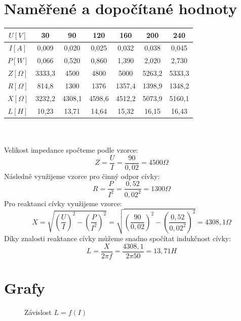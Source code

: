 \documentclass[12pt]{article} %
\begin{document}
\section{Naměřené a dopočítané hodnoty}
\begin{tabular}{|c|c|c|c|c|c|c|}
\hline 
$U[V]$ & 30 & 90 & 120 & 160 & 200 & 240 \\ 
\hline 
$I[A]$ & 0,009 & 0,020 & 0,025 & 0,032 & 0,038 & 0,045 \\ 
\hline 
$P[W]$ & 0,066 & 0,520 & 0,860 & 1,390 & 2,020 & 2,730 \\ 
\hline 
$Z[\Omega]$ & 3333,3 & 4500 & 4800 & 5000 & 5263,2 & 5333,3 \\ 
\hline 
$R[\Omega]$ & 814,8 & 1300 & 1376 & 1357,4 & 1398,9 & 1348,2 \\ 
\hline 
$X[\Omega]$ & 3232,2 & 4308,1 & 4598,6 & 4512,2 & 5073,9 & 5160,1 \\ 
\hline 
$L[H]$ & 10,23 & 13,71 & 14,64 & 15,32 & 16,15 & 16,43 \\ 
\hline 
\end{tabular}
\linebreak \\\\
Velikost impedance spočteme podle vzorce:
\begin{equation}
Z = \frac{U}{I} = \frac{90}{0,02} = 4500 \Omega
\end{equation}
Následně využijeme vzorce pro činný odpor cívky:
\begin{equation}
R = \frac{P}{I^2} = \frac{0,52}{0,02^2} = 1300 \Omega
\end{equation}
Pro reaktanci cívky využijeme vzorce:
\begin{equation}
X = \sqrt{\left(\frac{U}{I}\right)^2-\left(\frac{P}{I^2}\right)^2} = \sqrt{\left(\frac{90}{0,02}\right)^2-\left(\frac{0,52}{0,02^2}\right)^2} = 4308,1 \Omega
\end{equation}
Díky znalosti reaktance cívky můžeme snadno spočítat indukčnost cívky:
\begin{equation}
L = \frac{X}{2\pi f} = \frac{4308,1}{2\pi 50} = 13,71 H
\end{equation}

\section{Grafy}
\begin{figure}[H]
\centering
	\caption{Závislost $L=f(I)$}
\end{figure}
\end{document}
